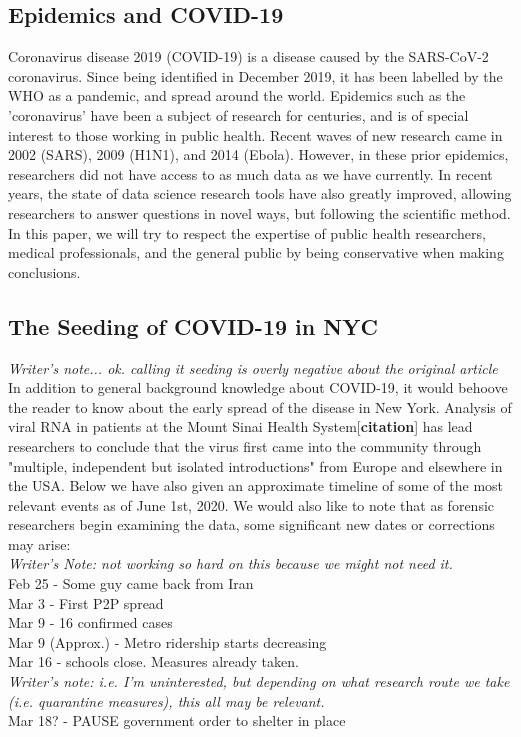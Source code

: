 \documentclass[12pt, a4, epsf] {article}
\theoremstyle{plain}
\theoremstyle{definition}
\begin{document}
\subsection*{Epidemics and COVID-19}
Coronavirus disease 2019 (COVID-19) is a disease caused by the SARS-CoV-2 coronavirus. Since being identified in December 2019, it has been labelled by the WHO as a pandemic, and spread around the world. Epidemics such as the 'coronavirus' have been a subject of research for centuries, and is of special interest to those working in public health. Recent waves of new research came in 2002 (SARS), 2009 (H1N1), and 2014 (Ebola). However, in these prior epidemics, researchers did not have access to as much data as we have currently. In recent years, the state of data science research tools have also greatly improved, allowing researchers to answer questions in novel ways, but following the scientific method. In this paper, we will try to respect the expertise of public health researchers, medical professionals, and the general public by being conservative when making conclusions.

\subsection*{The Seeding of COVID-19 in NYC}
\textit{Writer's note... ok. calling it seeding is overly negative about the original article\\}
In addition to general background knowledge about COVID-19, it would behoove the reader to know about the early spread of the disease in New York. Analysis of viral RNA in patients at the Mount Sinai Health System[\textbf{citation}] has lead researchers to conclude that the virus first came into the community through "multiple, independent but isolated introductions" from Europe and elsewhere in the USA. Below we have also given an approximate timeline of some of the most relevant events as of June 1st, 2020. We would also like to note that as forensic researchers begin examining the data, some significant new dates or corrections may arise:\\ 
\textit{Writer's Note: not working so hard on this because we might not need it.}\\
Feb 25 - Some guy came back from Iran\\
Mar 3 - First P2P spread\\
Mar 9 - 16 confirmed cases\\
Mar 9 (Approx.) - Metro ridership starts decreasing\\
Mar 16 - schools close. Measures already taken.\\
\textit{Writer's note: i.e. I'm uninterested, but depending on what research route we take (i.e. quarantine measures), this all may be relevant. }\\
Mar 18? - PAUSE government order to shelter in place\\
\end{document}
